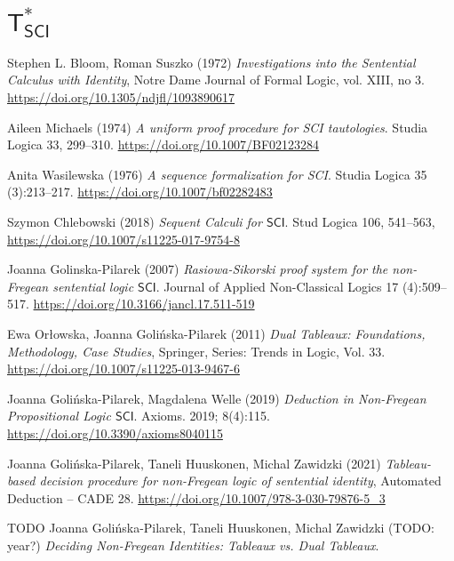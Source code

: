 \documentclass{article}
\theoremstyle{definition}
\theoremstyle{definition}
\theoremstyle{definition}
\newcommand{\SCI}{$\mathsf{SCI}$\xspace}
\newcommand{\TsSCI}{$\mathsf{T^*_{SCI}}$\xspace}
\begin{document}
\section{\TsSCI}

\begin{thebibliography}{9}
    Stephen L. Bloom, Roman Suszko (1972) \emph{Investigations into the Sentential Calculus with Identity}, Notre Dame Journal of Formal Logic, vol. XIII, no 3. \url{https://doi.org/10.1305/ndjfl/1093890617}

    Aileen Michaels (1974) \emph{A uniform proof procedure for SCI tautologies}. Studia Logica 33, 299--310. \url{https://doi.org/10.1007/BF02123284}

    Anita Wasilewska (1976) \emph{A sequence formalization for SCI}. Studia Logica 35 (3):213--217. \url{https://doi.org/10.1007/bf02282483}

    Szymon Chlebowski (2018) \emph{Sequent Calculi for \SCI}. Stud Logica 106, 541--563, \url{https://doi.org/10.1007/s11225-017-9754-8}

    Joanna Golinska-Pilarek (2007) \emph{Rasiowa-Sikorski proof system for the non-Fregean sentential logic \SCI}. Journal of Applied Non-Classical Logics 17 (4):509--517. \url{https://doi.org/10.3166/jancl.17.511-519}

    Ewa Orłowska, Joanna Golińska-Pilarek (2011) \emph{Dual Tableaux: Foundations, Methodology, Case Studies}, Springer, Series: Trends in Logic, Vol. 33. \url{https://doi.org/10.1007/s11225-013-9467-6}

    Joanna Golińska-Pilarek, Magdalena Welle (2019) \emph{Deduction in Non-Fregean Propositional Logic \SCI}. Axioms. 2019; 8(4):115. \url{https://doi.org/10.3390/axioms8040115}

    Joanna Golińska-Pilarek, Taneli Huuskonen, Michal Zawidzki (2021) \emph{Tableau-based decision procedure for non-Fregean logic of sentential identity}, Automated Deduction -- CADE 28. \url{https://doi.org/10.1007/978-3-030-79876-5_3}

    {
        \color{red}
        TODO Joanna Golińska-Pilarek, Taneli Huuskonen, Michal Zawidzki (TODO: year?) \emph{Deciding Non-Fregean Identities: Tableaux vs. Dual Tableaux}.
    }

\end{thebibliography}
\end{document}
